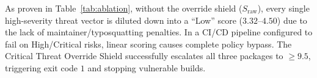 \begin{table}[h]
\centering
\caption{Ablation of the Critical Threat Override Shield.}
\label{tab:ablation}
\end{table}

As proven in Table~\ref{tab:ablation}, without the override shield ($S_{\text{raw}}$), every single high-severity threat vector is diluted down into a ``Low'' score ($3.32$--$4.50$) due to the lack of maintainer/typosquatting penalties. In a CI/CD pipeline configured to fail on High/Critical risks, linear scoring causes complete policy bypass. The Critical Threat Override Shield successfully escalates all three packages to $\ge 9.5$, triggering exit code $1$ and stopping vulnerable builds.
